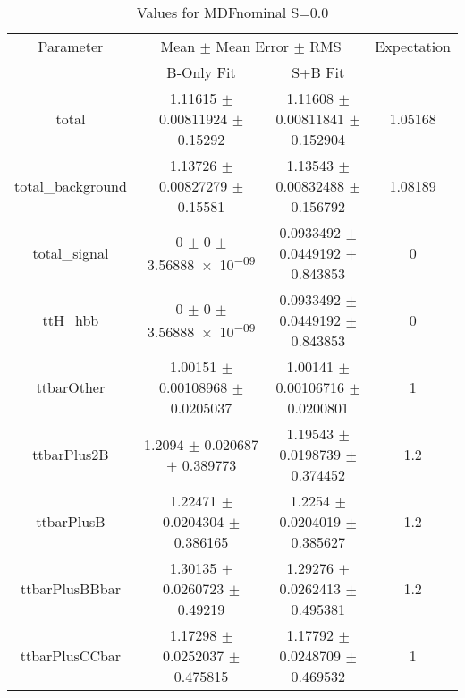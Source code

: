 \begin{table}
\centering
\caption{Values for MDFnominal S=0.0}
\begin{tabular}{cccc}
\toprule
Parameter & \multicolumn{2}{c}{Mean $\pm$ Mean Error $\pm$ RMS} & Expectation\\
 & B-Only Fit & S+B Fit & \\
\midrule
total & \num{1.11615} $\pm$ \num{0.00811924} $\pm$ \num{0.15292} & \num{1.11608} $\pm$ \num{0.00811841} $\pm$ \num{0.152904} & \num{1.05168}\\
total\_background & \num{1.13726} $\pm$ \num{0.00827279} $\pm$ \num{0.15581} & \num{1.13543} $\pm$ \num{0.00832488} $\pm$ \num{0.156792} & \num{1.08189}\\
total\_signal & \num{0} $\pm$ \num{0} $\pm$ \num{3.56888e-09} & \num{0.0933492} $\pm$ \num{0.0449192} $\pm$ \num{0.843853} & \num{0}\\
ttH\_hbb & \num{0} $\pm$ \num{0} $\pm$ \num{3.56888e-09} & \num{0.0933492} $\pm$ \num{0.0449192} $\pm$ \num{0.843853} & \num{0}\\
ttbarOther & \num{1.00151} $\pm$ \num{0.00108968} $\pm$ \num{0.0205037} & \num{1.00141} $\pm$ \num{0.00106716} $\pm$ \num{0.0200801} & \num{1}\\
ttbarPlus2B & \num{1.2094} $\pm$ \num{0.020687} $\pm$ \num{0.389773} & \num{1.19543} $\pm$ \num{0.0198739} $\pm$ \num{0.374452} & \num{1.2}\\
ttbarPlusB & \num{1.22471} $\pm$ \num{0.0204304} $\pm$ \num{0.386165} & \num{1.2254} $\pm$ \num{0.0204019} $\pm$ \num{0.385627} & \num{1.2}\\
ttbarPlusBBbar & \num{1.30135} $\pm$ \num{0.0260723} $\pm$ \num{0.49219} & \num{1.29276} $\pm$ \num{0.0262413} $\pm$ \num{0.495381} & \num{1.2}\\
ttbarPlusCCbar & \num{1.17298} $\pm$ \num{0.0252037} $\pm$ \num{0.475815} & \num{1.17792} $\pm$ \num{0.0248709} $\pm$ \num{0.469532} & \num{1}\\
\bottomrule
\end{tabular}
\end{table}